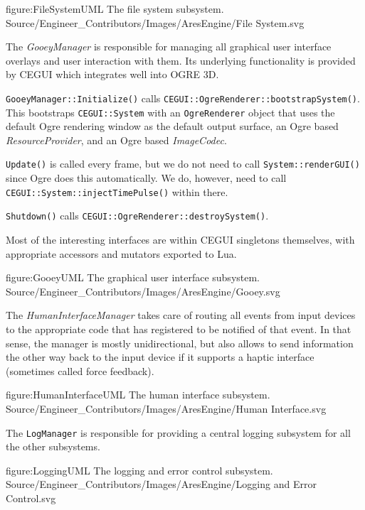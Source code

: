 \FullPageDiagram
    {figure:FileSystemUML}
    {The file system subsystem.}
    {Source/Engineer_Contributors/Images/AresEngine/File System.svg}

\page 
{}
The {\it GooeyManager} is responsible for managing all graphical user interface overlays and user interaction with them. Its underlying functionality is provided by CEGUI which integrates well into OGRE 3D.

{\tt GooeyManager::Initialize()} calls {\tt CEGUI::OgreRenderer::bootstrapSystem()}. This bootstraps {\tt CEGUI::System} with an {\tt OgreRenderer} object that uses the default Ogre rendering window as the default output surface, an Ogre based {\it ResourceProvider}, and an Ogre based {\it ImageCodec}.

{\tt Update()} is called every frame, but we do not need to call {\tt System::renderGUI()} since Ogre does this automatically. We do, however, need to call {\tt CEGUI::System::injectTimePulse()} within there.

{\tt Shutdown()} calls {\tt CEGUI::OgreRenderer::destroySystem()}.

Most of the interesting interfaces are within CEGUI singletons themselves, with appropriate accessors and mutators exported to Lua.

\FullPageDiagram
    {figure:GooeyUML}
    {The graphical user interface subsystem.}
    {Source/Engineer_Contributors/Images/AresEngine/Gooey.svg}

\page 
{}
The {\it HumanInterfaceManager} takes care of routing all events from input devices to the appropriate code that has registered to be notified of that event. In that sense, the manager is mostly unidirectional, but also allows to send information the other way back to the input device if it supports a haptic interface (sometimes called force feedback).

\FullPageDiagram
    {figure:HumanInterfaceUML}
    {The human interface subsystem.}
    {Source/Engineer_Contributors/Images/AresEngine/Human Interface.svg}

\page 
{}
The {\tt LogManager} is responsible for providing a central logging subsystem for all the other subsystems.

\FullPageDiagram
    {figure:LoggingUML}
    {The logging and error control subsystem.}
    {Source/Engineer_Contributors/Images/AresEngine/Logging and Error Control.svg}
    
